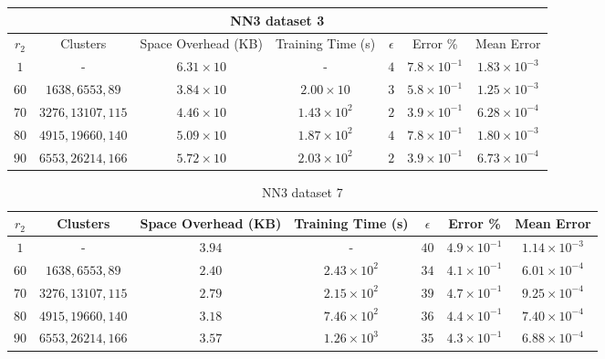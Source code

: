 \begin{adjustwidth}{-1.5cm}{}
\begin{table}
\begin{tabular}{ccccccc}
\hline
\multicolumn{7}{c}{NN3 dataset 3} \\
\toprule
$r_2$ & Clusters & Space Overhead (KB) & Training Time (s) & $\epsilon$ & Error \% & Mean Error\\
\midrule
$1$ & - & $6.31 \times 10$ & - & $4$ & $7.8 \times 10^{-1}$ & $1.83 \times 10^{-3}$\\
$60$ & $1638, 6553, 89$ & $3.84 \times 10$ & $2.00 \times 10$ & $3$ & $5.8 \times 10^{-1}$ & $1.25 \times 10^{-3}$\\
$70$ & $3276, 13107, 115$ & $4.46 \times 10$ & $1.43 \times 10^2$ & $2$ & $3.9 \times 10^{-1}$ & $6.28 \times 10^{-4}$\\
$80$ & $4915, 19660, 140$ & $5.09 \times 10$ & $1.87 \times 10^2$ & $4$ & $7.8 \times 10^{-1}$ & $1.80 \times 10^{-3}$\\
$90$ & $6553, 26214, 166$ & $5.72 \times 10$ & $2.03 \times 10^2$ & $2$ & $3.9 \times 10^{-1}$ & $6.73 \times 10^{-4}$\\
\bottomrule
\end{tabular}
\end{table}
\end{adjustwidth}

\par\null\par
\par\null\par

\begin{adjustwidth}{-1.5cm}{}
\begin{table}
\caption{NN3 dataset 7}\label{ws37}
\begin{tabular}{ccccccc}
\hline
\toprule
$r_2$ & Clusters & Space Overhead (KB) & Training Time (s) & $\epsilon$ & Error \% & Mean Error\\
\midrule
$1$  & - & $3.94$ & - & $40$ & $4.9 \times 10^{-1}$ & $1.14 \times 10^{-3}$\\
$60$ & $1638, 6553, 89$ & $2.40$ & $2.43 \times 10^2$ & $34$ & $4.1 \times 10^{-1}$ & $6.01 \times 10^{-4}$\\
$70$ & $3276, 13107, 115$ & $2.79$ & $2.15 \times 10^2$ & $39$ & $4.7 \times 10^{-1}$ & $9.25 \times 10^{-4}$\\
$80$ & $4915, 19660, 140$ & $3.18$ & $7.46 \times 10^2$ & $36$ & $4.4 \times 10^{-1}$ & $7.40 \times 10^{-4}$\\
$90$ & $6553, 26214, 166$ & $3.57$ & $1.26 \times 10^3$ & $35$ & $4.3 \times 10^{-1}$ & $6.88 \times 10^{-4}$\\
\bottomrule
\end{tabular}
\end{table}
\end{adjustwidth}

